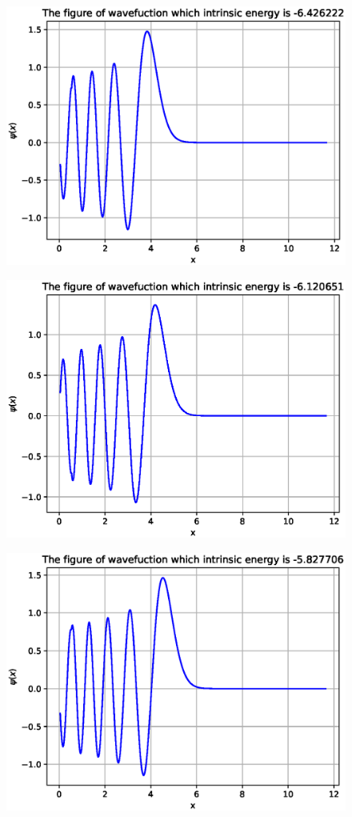 \documentclass[twoside,twocolumn]{article}
\begin{document}
\begin{CJK*}{UTF8}{gkai}
\begin{figure}
	\label{fig:7}
\end{figure}
\begin{figure}
	\centering
	\includegraphics[width=0.9\linewidth]{figure/8}
	\label{fig:8}
\end{figure}
\begin{figure}
	\centering
	\includegraphics[width=0.9\linewidth]{figure/9}
	\label{fig:9}
\end{figure}
\begin{figure}
	\centering
	\includegraphics[width=0.9\linewidth]{figure/10}

\end{figure}
\end{CJK*}
\end{document}
